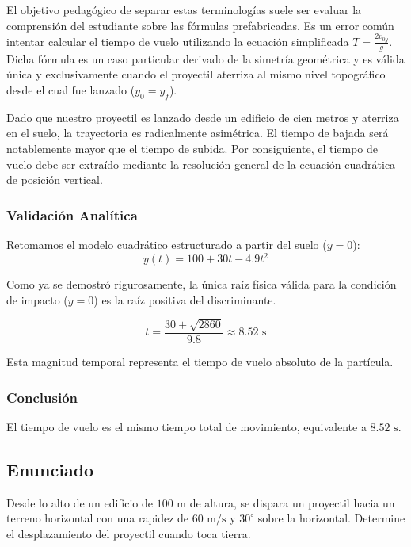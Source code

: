 \documentclass[12pt, a4paper]{article}
\begin{document}
El objetivo pedagógico de separar estas terminologías suele ser evaluar la comprensión del estudiante sobre las fórmulas prefabricadas. Es un error común intentar calcular el tiempo de vuelo utilizando la ecuación simplificada $T = \frac{2v_{0y}}{g}$. Dicha fórmula es un caso particular derivado de la simetría geométrica y es válida única y exclusivamente cuando el proyectil aterriza al mismo nivel topográfico desde el cual fue lanzado ($y_0 = y_f$). 

Dado que nuestro proyectil es lanzado desde un edificio de cien metros y aterriza en el suelo, la trayectoria es radicalmente asimétrica. El tiempo de bajada será notablemente mayor que el tiempo de subida. Por consiguiente, el tiempo de vuelo debe ser extraído mediante la resolución general de la ecuación cuadrática de posición vertical.

\subsubsection*{Validación Analítica}

Retomamos el modelo cuadrático estructurado a partir del suelo ($y=0$):
\begin{equation}
y(t) = 100 + 30t - 4.9t^2
\end{equation}

Como ya se demostró rigurosamente, la única raíz física válida para la condición de impacto ($y = 0$) es la raíz positiva del discriminante.

\begin{equation}
t = \frac{30 + \sqrt{2860}}{9.8} \approx 8.52 \text{ s}
\end{equation}

Esta magnitud temporal representa el tiempo de vuelo absoluto de la partícula.

\subsubsection*{Conclusión}

El tiempo de vuelo es el mismo tiempo total de movimiento, equivalente a $8.52 \text{ s}$.

\newpage

\subsection*{Enunciado}

Desde lo alto de un edificio de $100 \text{ m}$ de altura, se dispara un proyectil hacia un terreno horizontal con una rapidez de $60 \text{ m/s}$ y $30^\circ$ sobre la horizontal. Determine el desplazamiento del proyectil cuando toca tierra.
\end{document}
